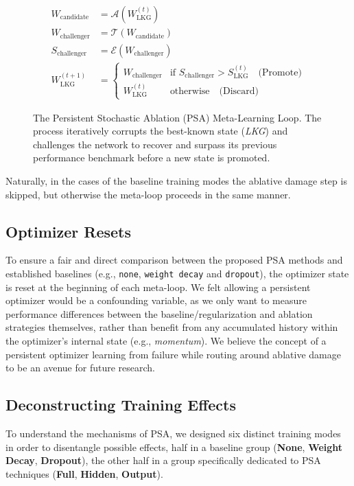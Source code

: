 \documentclass[conference]{IEEEtran}
\begin{document}
\begin{figure}[h!]
\centering
\begin{align*}
W_{\text{candidate}} &= \mathcal{A}(W_{\text{LKG}}^{(t)}) \\[1em]
W_{\text{challenger}} &= \mathcal{T}(W_{\text{candidate}}) \\[1em]
S_{\text{challenger}} &= \mathcal{E}(W_{\text{challenger}}) \\[1em]
W_{\text{LKG}}^{(t+1)} &=
\begin{cases}
W_{\text{challenger}} & \text{if } S_{\text{challenger}} > S_{\text{LKG}}^{(t)} \quad \text{(Promote)} \\
W_{\text{LKG}}^{(t)} & \text{otherwise} \quad \text{(Discard)}
\end{cases}
\end{align*}
\caption{The Persistent Stochastic Ablation (PSA) Meta-Learning Loop. The process iteratively corrupts the best-known state (\textit{LKG}) and challenges the network to recover and surpass its previous performance benchmark before a new state is promoted.}
\label{fig:psa-loop}
\end{figure}

Naturally, in the cases of the baseline training modes the ablative damage step is skipped, but otherwise the meta-loop proceeds in the same manner.

\subsection{Optimizer Resets}
To ensure a fair and direct comparison between the proposed PSA methods and established baselines (e.g., \verb|none|, \verb|weight decay| and \verb|dropout|), the optimizer state is reset at the beginning of each meta-loop. We felt allowing a persistent optimizer would be a confounding variable, as we only want to measure performance differences between the baseline/regularization and ablation strategies themselves, rather than benefit from any accumulated history within the optimizer's internal state (e.g., \textit{momentum}). We believe the concept of a persistent optimizer learning from failure while routing around ablative damage to be an avenue for future research.

\subsection{Deconstructing Training Effects}
To understand the mechanisms of PSA, we designed six distinct training modes in order to disentangle possible effects, half in a baseline group (\textbf{None}, \textbf{Weight Decay}, \textbf{Dropout}), the other half in a group specifically dedicated to PSA techniques (\textbf{Full}, \textbf{Hidden}, \textbf{Output}). 
\end{document}
